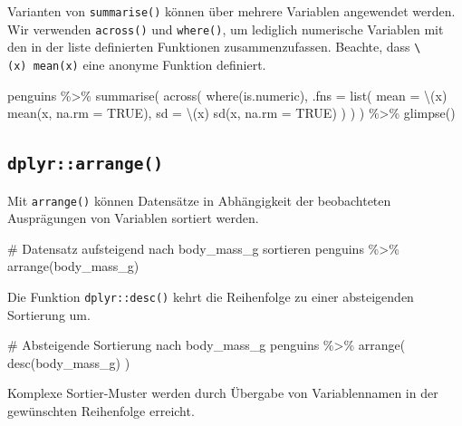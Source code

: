 \documentclass[
  a4paper,
  DIV=11,
  oneside]{scrreprt}
\newenvironment{Shaded}{\begin{snugshade}}{\end{snugshade}}
\newcommand{\NormalTok}[1]{\textcolor[rgb]{0.00,0.23,0.31}{#1}}
\begin{document}
Varianten von \texttt{summarise()} können über mehrere Variablen
angewendet werden. Wir verwenden \texttt{across()} und \texttt{where()},
um lediglich numerische Variablen mit den in der liste definierten
Funktionen zusammenzufassen. Beachte, dass
\texttt{\textbackslash{}(x)\ mean(x)} eine anonyme Funktion definiert.

\begin{Shaded}
\begin{Highlighting}[]
\NormalTok{penguins \%\textgreater{}\% }
\NormalTok{  summarise(}
\NormalTok{    across(}
\NormalTok{      where(is.numeric), }
\NormalTok{      .fns = list(}
\NormalTok{        mean = \textbackslash{}(x) mean(x, na.rm = TRUE), }
\NormalTok{        sd = \textbackslash{}(x) sd(x, na.rm = TRUE)}
\NormalTok{      )}
\NormalTok{    )}
\NormalTok{  ) \%\textgreater{}\%}
\NormalTok{  glimpse()}
\end{Highlighting}
\end{Shaded}

\hypertarget{dplyrarrange}{%
\subsection{\texorpdfstring{\texttt{dplyr::arrange()}}{dplyr::arrange()}}\label{dplyrarrange}}

Mit \texttt{arrange()} können Datensätze in Abhängigkeit der
beobachteten Ausprägungen von Variablen sortiert werden.

\begin{Shaded}
\begin{Highlighting}[]
\NormalTok{\# Datensatz aufsteigend nach \textquotesingle{}body\_mass\_g\textquotesingle{} sortieren}
\NormalTok{penguins \%\textgreater{}\% }
\NormalTok{  arrange(body\_mass\_g)}
\end{Highlighting}
\end{Shaded}

Die Funktion \texttt{dplyr::desc()} kehrt die Reihenfolge zu einer
absteigenden Sortierung um.

\begin{Shaded}
\begin{Highlighting}[]
\NormalTok{\# Absteigende Sortierung nach \textquotesingle{}body\_mass\_g\textquotesingle{}}
\NormalTok{penguins \%\textgreater{}\% }
\NormalTok{  arrange(}
\NormalTok{    desc(body\_mass\_g)}
\NormalTok{  )}
\end{Highlighting}
\end{Shaded}

Komplexe Sortier-Muster werden durch Übergabe von Variablennamen in der
gewünschten Reihenfolge erreicht.
\end{document}
